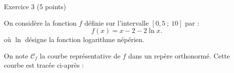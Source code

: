 
%
\begin{h2}Exercice 3 (5 points)\end{h2}
\par
On considère la fonction $f$ définie sur l'intervalle $[0,5~;~10]$ par :
\[ f(x)=x-2-2\ln x. \]
où $\ln$ désigne la fonction logarithme népérien.
\par
On note $\mathscr{C}_f$ la courbe représentative de $f$ dans un repère orthonormé. Cette courbe est tracée ci-après :

\begin{center}
\end{center}

